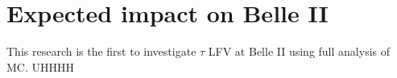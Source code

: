 \documentclass[12pt]{thesis}  %
\begin{document}
\section{Expected impact on Belle II}

This research is the first to investigate $\tau$ LFV at Belle II using full analysis of MC. UHHHH



\newpage

\end{document}
